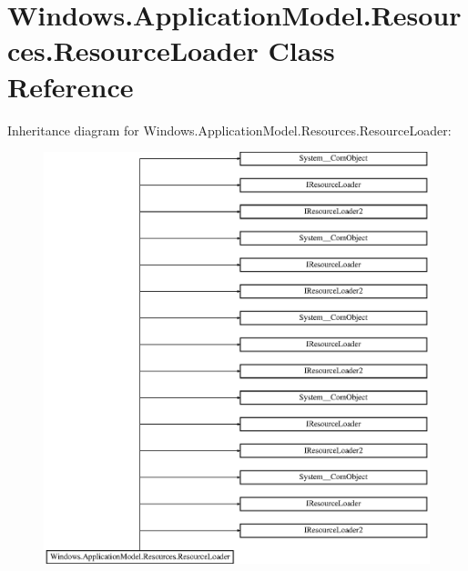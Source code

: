 \hypertarget{class_windows_1_1_application_model_1_1_resources_1_1_resource_loader}{}\section{Windows.\+Application\+Model.\+Resources.\+Resource\+Loader Class Reference}
\label{class_windows_1_1_application_model_1_1_resources_1_1_resource_loader}
Inheritance diagram for Windows.\+Application\+Model.\+Resources.\+Resource\+Loader\+:\begin{figure}[H]
\begin{center}
\leavevmode
\includegraphics[height=12.000000cm]{class_windows_1_1_application_model_1_1_resources_1_1_resource_loader}
\end{center}
\end{figure}
